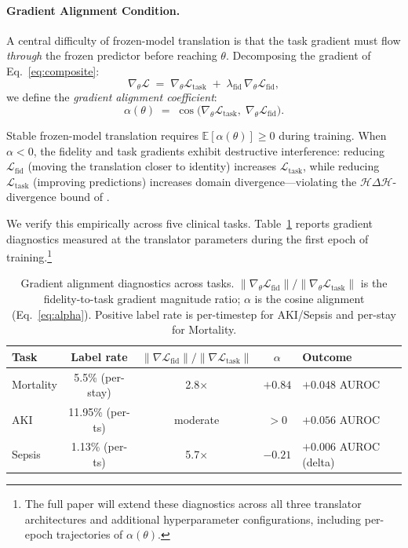 \paragraph{Gradient Alignment Condition.}
A central difficulty of frozen-model translation is that the task gradient must flow \emph{through} the frozen predictor before reaching $\theta$.
Decomposing the gradient of Eq.~\ref{eq:composite}:
\begin{equation}
\label{eq:grad_decomp}
\nabla_\theta \mathcal{L} \;=\; \nabla_\theta \mathcal{L}_{\mathrm{task}} \;+\; \lambda_{\mathrm{fid}}\,\nabla_\theta \mathcal{L}_{\mathrm{fid}},
\end{equation}
we define the \emph{gradient alignment coefficient}:
\begin{equation}
\label{eq:alpha}
\alpha(\theta) \;=\; \cos\!\bigl(\nabla_\theta \mathcal{L}_{\mathrm{task}},\;\nabla_\theta \mathcal{L}_{\mathrm{fid}}\bigr).
\end{equation}

\begin{proposition}
\label{prop:alignment}
Stable frozen-model translation requires $\mathbb{E}[\alpha(\theta)] \geq 0$ during training.
When $\alpha < 0$, the fidelity and task gradients exhibit destructive interference: reducing $\mathcal{L}_{\mathrm{fid}}$ (moving the translation closer to identity) increases $\mathcal{L}_{\mathrm{task}}$, while reducing $\mathcal{L}_{\mathrm{task}}$ (improving predictions) increases domain divergence---violating the $\mathcal{H}\Delta\mathcal{H}$-divergence bound of \citet{bendavid2010}.
\end{proposition}

We verify this empirically across five clinical tasks.
Table~\ref{tab:alpha} reports gradient diagnostics measured at the translator parameters during the first epoch of training.\footnote{The full paper will extend these diagnostics across all three translator architectures and additional hyperparameter configurations, including per-epoch trajectories of $\alpha(\theta)$.}

\begin{table}[h]
\centering
\small
\caption{Gradient alignment diagnostics across tasks. $\|\nabla_\theta \mathcal{L}_{\mathrm{fid}}\| / \|\nabla_\theta \mathcal{L}_{\mathrm{task}}\|$ is the fidelity-to-task gradient magnitude ratio; $\alpha$ is the cosine alignment (Eq.~\ref{eq:alpha}). Positive label rate is per-timestep for AKI/Sepsis and per-stay for Mortality.}
\label{tab:alpha}
\begin{tabular}{lcccl}
\toprule
\textbf{Task} & \textbf{Label rate} & $\|\nabla \mathcal{L}_{\mathrm{fid}}\| / \|\nabla \mathcal{L}_{\mathrm{task}}\|$ & $\alpha$ & \textbf{Outcome} \\
\midrule
Mortality & 5.5\% (per-stay) & 2.8$\times$ & $+0.84$ & $+0.048$ AUROC \\
AKI & 11.95\% (per-ts) & moderate & $>0$ & $+0.056$ AUROC \\
Sepsis & 1.13\% (per-ts) & 5.7$\times$ & $-0.21$ & $+0.006$ AUROC (delta) \\
\bottomrule
\end{tabular}
\end{table}

